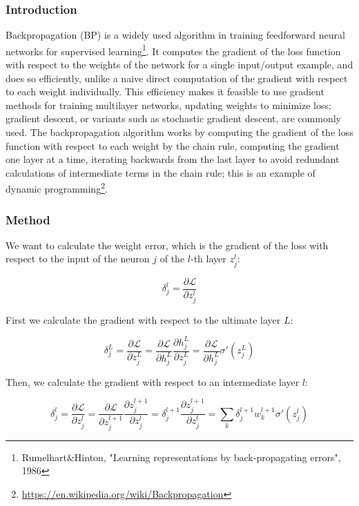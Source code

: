 \documentclass[main]{subfiles}
\begin{document}
\subsubsection{Introduction}
Backpropagation (BP) is a widely used algorithm in training feedforward neural networks for supervised learning\footnote{Rumelhart\&Hinton, "Learning representations by back-propagating errors", 1986}. It computes the gradient of the loss function with respect to the weights of the network for a single input/output example, and does so efficiently, unlike a naive direct computation of the gradient with respect to each weight individually. This efficiency makes it feasible to use gradient methods for training multilayer networks, updating weights to minimize loss; gradient descent, or variants such as stochastic gradient descent, are commonly used. The backpropagation algorithm works by computing the gradient of the loss function with respect to each weight by the chain rule, computing the gradient one layer at a time, iterating backwards from the last layer to avoid redundant calculations of intermediate terms in the chain rule; this is an example of dynamic programming\footnote{\url{https://en.wikipedia.org/wiki/Backpropagation}}.

\subsubsection{Method}
We want to calculate the weight error, which is the gradient of the loss with respect to the input of the neuron $j$ of the $l$-th layer $z_j^l$:

\begin{equation}
    \delta_j^l = \frac{\partial \mathcal{L}}{\partial z_j^l}
\end{equation}

First we calculate the gradient with respect to the ultimate layer $L$:

\begin{equation}
    \delta_j^L = \frac{\partial \mathcal{L}}{\partial z_j^L} =  \frac{\partial \mathcal{L}}{\partial h_j^L}\frac{\partial h_j^L}{\partial z_j^L} = \frac{\partial \mathcal{L}}{\partial h_j^L} \sigma'(z_j^L)
\end{equation}

Then, we calculate the gradient with respect to an intermediate layer $l$:

\begin{equation}
    \delta_j^l = \frac{\partial \mathcal{L}}{\partial z_j^l} =  \frac{\partial \mathcal{L}}{\partial z_j^{l+1}}\frac{\partial z_j^{l+1}}{\partial z_j^l} = \delta_j^{l+1} \frac{\partial z_j^{l+1}}{\partial z_j^l} = \sum_k \delta_j^{l+1} w_k^{l+1} \sigma'(z_j^l)
\end{equation}
\end{document}
